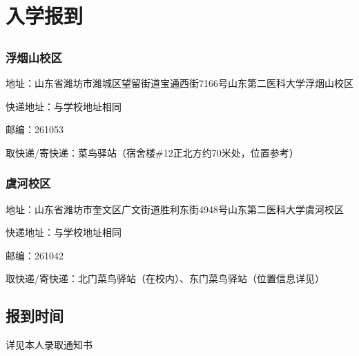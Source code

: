 \section[入学报到]{入学报到}

\subsection[地址与快递]{}
\subsubsection[浮烟山校区]{浮烟山校区}
地址：山东省潍坊市潍城区望留街道宝通西街7166号山东第二医科大学浮烟山校区

快递地址：与学校地址相同

邮编：261053

取快递/寄快递：菜鸟驿站（宿舍楼\#12正北方约70米处，位置参考）\footnotemark
{}

\subsubsection[虞河校区]{虞河校区}
地址：山东省潍坊市奎文区广文街道胜利东街4948号山东第二医科大学虞河校区

快递地址：与学校地址相同

邮编：261042

取快递/寄快递：北门菜鸟驿站（在校内）、东门菜鸟驿站（位置信息详见）\footnotemark
{}

\subsection[报到时间]{报到时间}
详见本人录取通知书

